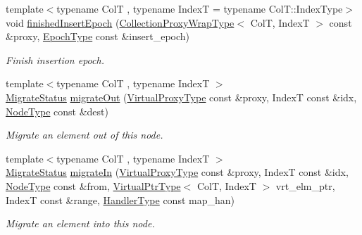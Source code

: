 \begin{DoxyCompactItemize}
{\footnotesize template$<$typename ColT , typename IndexT  = typename Col\+T\+::\+Index\+Type$>$ }\\void \hyperlink{structvt_1_1vrt_1_1collection_1_1_collection_manager_ac59dd2227839839776c92ca0c23934e5}{finished\+Insert\+Epoch} (\hyperlink{structvt_1_1vrt_1_1collection_1_1_collection_manager_a56458ed7f9bb22b631b9b3a745f42f94}{Collection\+Proxy\+Wrap\+Type}$<$ ColT, IndexT $>$ const \&proxy, \hyperlink{namespacevt_a985a5adf291c34a3ca263b3378388236}{Epoch\+Type} const \&insert\+\_\+epoch)
\begin{DoxyCompactList}\small\item\em Finish insertion epoch. \end{DoxyCompactList}\item 
{\footnotesize template$<$typename ColT , typename IndexT $>$ }\\\hyperlink{namespacevt_1_1vrt_1_1collection_ad221ad8aea9e586689b4335f5bcd9804}{Migrate\+Status} \hyperlink{structvt_1_1vrt_1_1collection_1_1_collection_manager_a480360a498a18520cbe2405ebbe7e9b6}{migrate\+Out} (\hyperlink{namespacevt_a1b417dd5d684f045bb58a0ede70045ac}{Virtual\+Proxy\+Type} const \&proxy, IndexT const \&idx, \hyperlink{namespacevt_a866da9d0efc19c0a1ce79e9e492f47e2}{Node\+Type} const \&dest)
\begin{DoxyCompactList}\small\item\em Migrate an element out of this node. \end{DoxyCompactList}\item 
{\footnotesize template$<$typename ColT , typename IndexT $>$ }\\\hyperlink{namespacevt_1_1vrt_1_1collection_ad221ad8aea9e586689b4335f5bcd9804}{Migrate\+Status} \hyperlink{structvt_1_1vrt_1_1collection_1_1_collection_manager_a1d07c5bb024453ca2ec2837cffead2bf}{migrate\+In} (\hyperlink{namespacevt_a1b417dd5d684f045bb58a0ede70045ac}{Virtual\+Proxy\+Type} const \&proxy, IndexT const \&idx, \hyperlink{namespacevt_a866da9d0efc19c0a1ce79e9e492f47e2}{Node\+Type} const \&from, \hyperlink{structvt_1_1vrt_1_1collection_1_1_collection_manager_a1da9015e52d6ecca955f57b59aab0b82}{Virtual\+Ptr\+Type}$<$ ColT, IndexT $>$ vrt\+\_\+elm\+\_\+ptr, IndexT const \&range, \hyperlink{namespacevt_af64846b57dfcaf104da3ef6967917573}{Handler\+Type} const map\+\_\+han)
\begin{DoxyCompactList}\small\item\em Migrate an element into this node. \end{DoxyCompactList}\item 

\end{DoxyCompactItemize}
